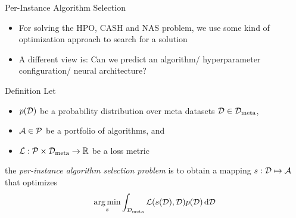 \begin{frame}[c]{Per-Instance Algorithm Selection}

\begin{itemize}
	\item For solving the HPO, CASH and NAS problem, we use some kind of optimization approach to \alert{search} for a solution
	\pause
	\item A different view is: Can we \alert{predict} an algorithm/ hyperparameter configuration/ neural architecture?
\end{itemize}

\pause
\begin{block}{Definition}
	Let 
	\begin{itemize}
		\item $p(\mathcal{D})$ be a probability \alert{distribution} over meta datasets $\mathcal{D} \in \mathcal{D}_{\text{meta}}$,
		\pause
		\item $\mathcal{A} \in \mathcal{P}$ be a portfolio of algorithms, and
		\pause
		\item $\mathcal{L}: \mathcal{P} \times \mathcal{D}_{\text{meta}} \rightarrow \mathbb{R}$ be a loss metric   
	\end{itemize}
	
	\pause
	the \emph{per-instance algorithm selection problem} is to obtain a mapping 
	$s: \mathcal{D} \mapsto \mathcal{A}$ 
	that optimizes 
	$$\operatorname*{arg\,min}_{s} \int_{\mathcal{D}_{\text{meta}}} \mathcal{L}(s(\mathcal{D}),\mathcal{D}) p(\mathcal{D}) \mathop{}\!\mathrm{d}\mathcal{D}$$
\end{block}

\end{frame}
